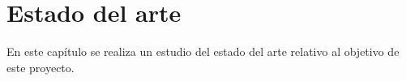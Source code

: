 
\chapter{Estado del arte}

En este capítulo se realiza un estudio del estado del arte relativo al objetivo de este proyecto.

